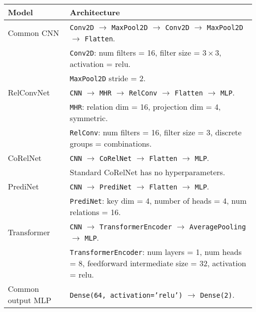 \begin{tabular}{p{}p{}}
    \toprule
    Model              & Architecture                                                                                                                                                                                                                                                                                       \\ \midrule
    Common CNN        & \texttt{Conv2D} $\to$ \texttt{MaxPool2D} $\to$ \texttt{Conv2D} $\to$ \texttt{MaxPool2D} $\to$ \texttt{Flatten}. \\
    & \texttt{Conv2D}: num filters = 16, filter size = $3 \times 3$, activation = relu. \\
    & \texttt{MaxPool2D} stride = 2. \\\hline
    RelConvNet        & \texttt{CNN} $\to$ \texttt{MHR} $\to$ \texttt{RelConv} $\to$ \texttt{Flatten} $\to$ \texttt{MLP}. \\
    & \texttt{MHR}: relation dim = 16, projection dim = 4, symmetric. \\
    & \texttt{RelConv}: num filters = 16, filter size = 3, discrete groups = combinations. \\\hline
    CoRelNet          & \texttt{CNN} $\to$ \texttt{CoRelNet} $\to$ \texttt{Flatten} $\to$ \texttt{MLP}. \\
    & Standard CoRelNet has no hyperparameters. \\\hline
    PrediNet          & \texttt{CNN} $\to$ \texttt{PrediNet} $\to$ \texttt{Flatten} $\to$ \texttt{MLP}. \\
    & \texttt{PrediNet}: key dim = 4, number of heads = 4, num relations = 16. \\\hline
    Transformer       & \texttt{CNN} $\to$ \texttt{TransformerEncoder} $\to$ \texttt{AveragePooling} $\to$ \texttt{MLP}. \\
    & \texttt{TransformerEncoder}: num layers = 1, num heads = 8, feedforward intermediate size = 32, activation = relu. \\\hline
    Common output MLP & \texttt{Dense(64, activation='relu')} $\to$ \texttt{Dense(2)}.                                                                                                                                                                                                              \\ \bottomrule
\end{tabular}